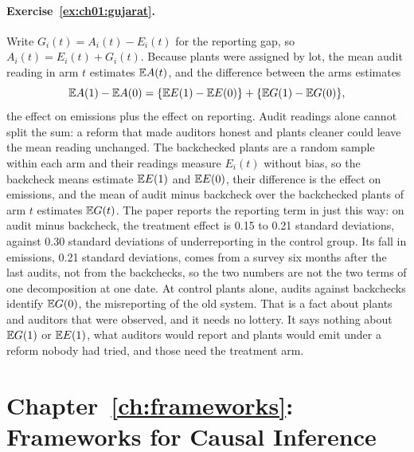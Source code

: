 \paragraph{Exercise~\ref{ex:ch01:gujarat}.} Write $G_i(t) = A_i(t) - E_i(t)$ for the reporting gap, so $A_i(t) = E_i(t) + G_i(t)$. Because plants were assigned by lot, the mean audit reading in arm $t$ estimates $\mathbb{E} A(t)$, and the difference between the arms estimates
\[
\mathbb{E} A(1) - \mathbb{E} A(0) = \{\mathbb{E} E(1) - \mathbb{E} E(0)\} + \{\mathbb{E} G(1) - \mathbb{E} G(0)\},
\]
the effect on emissions plus the effect on reporting. Audit readings alone cannot split the sum: a reform that made auditors honest and plants cleaner could leave the mean reading unchanged. The backchecked plants are a random sample within each arm and their readings measure $E_i(t)$ without bias, so the backcheck means estimate $\mathbb{E} E(1)$ and $\mathbb{E} E(0)$, their difference is the effect on emissions, and the mean of audit minus backcheck over the backchecked plants of arm $t$ estimates $\mathbb{E} G(t)$. The paper reports the reporting term in just this way: on audit minus backcheck, the treatment effect is 0.15 to 0.21 standard deviations, against 0.30 standard deviations of underreporting in the control group. Its fall in emissions, 0.21 standard deviations, comes from a survey six months after the last audits, not from the backchecks, so the two numbers are not the two terms of one decomposition at one date. At control plants alone, audits against backchecks identify $\mathbb{E} G(0)$, the misreporting of the old system. That is a fact about plants and auditors that were observed, and it needs no lottery. It says nothing about $\mathbb{E} G(1)$ or $\mathbb{E} E(1)$, what auditors would report and plants would emit under a reform nobody had tried, and those need the treatment arm.

\section*{Chapter~\ref{ch:frameworks}: Frameworks for Causal Inference}

